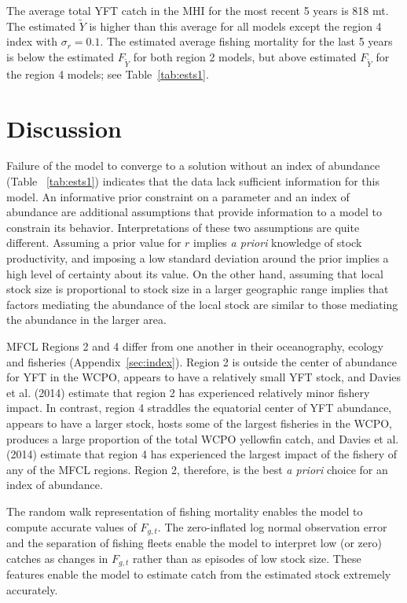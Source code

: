 \documentclass[12pt,letterpaper]{article}
\newcommand\MSY{\widetilde{Y}}
\newcommand\Fmsy{F_{\MSY}}
\begin{document}
The average total YFT catch in the MHI for the most recent 5 years
is 818 mt. The estimated $\MSY$ is higher than this average for all
models except the region 4 index with $\sigma_r=0.1$.
The estimated average fishing mortality for the last 5 years is below
the estimated $\Fmsy$ for both region 2 models, but above estimated
$\Fmsy$ for the region 4 models; see Table~\ref{tab:ests1}.

\section*{Discussion}
Failure of the model to converge to a solution without an index of
abundance (Table~ \ref{tab:ests1})
indicates that the data lack sufficient information for this model.
An informative prior constraint on a parameter and an index of abundance are 
additional assumptions that provide information to a model
to constrain its behavior.
Interpretations of these two assumptions are quite different. 
Assuming a prior value for $r$ implies {\it a priori} knowledge of stock
productivity, and imposing a low standard deviation around the
prior implies a high level of certainty about its value.
On the other hand,
assuming that local stock size is proportional to stock size in
a larger geographic range
implies that factors mediating the abundance
of the local stock are similar to those mediating the
abundance in the larger area.

MFCL Regions 2 and 4 differ from one another in their oceanography,
ecology and fisheries (Appendix~\ref{sec:index}).
Region 2 is outside the center of abundance for YFT in the
WCPO, appears to have a relatively small YFT stock, and Davies et al. (2014)
estimate that region 2 has experienced relatively minor fishery impact.
In contrast, region 4 straddles the equatorial center of YFT abundance,
appears to have a larger stock, hosts some of the largest fisheries in the WCPO,
produces a large proportion of the total WCPO yellowfin catch, and
Davies et al. (2014) estimate that region 4 has experienced
the largest impact of the fishery of any of the MFCL regions.
Region 2, therefore, is the best {\it a priori} choice for
an index of abundance.

The random walk representation of fishing mortality enables
the model to compute accurate values of $F_{g,t}$. The zero-inflated
log normal observation error and the separation of fishing fleets
enable the model to interpret low (or zero) catches as changes in
$F_{g,t}$ rather than as episodes of low stock size.
These features enable the model to estimate catch
from the estimated stock extremely accurately.
\end{document}
